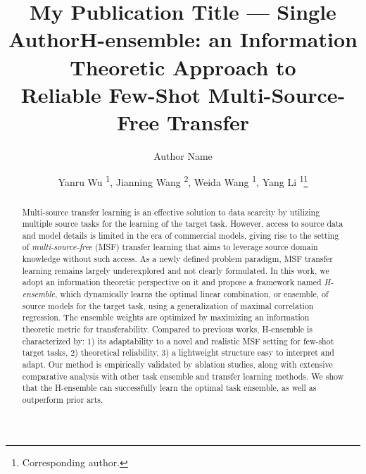 \documentclass[letterpaper]{article} %
\title{My Publication Title --- Single Author}
\author {
    Author Name
}
\title{H-ensemble: an Information Theoretic Approach to \\Reliable Few-Shot Multi-Source-Free Transfer}
\author {
    Yanru Wu \textsuperscript{\rm 1}, %
    Jianning Wang \textsuperscript{\rm 2},
    Weida Wang \textsuperscript{\rm 1},
    Yang Li \textsuperscript{\rm 1}\footnote{Corresponding author.} %
}
\begin{document}
\maketitle

\begin{abstract}
Multi-source transfer learning is an effective solution to data scarcity by utilizing multiple source tasks for the learning of the target task. However, access to source data and model details is limited in the era of commercial models, giving rise to the setting of \textit{multi-source-free} (MSF) transfer learning that aims to leverage source domain knowledge without such access. As a newly defined problem paradigm, MSF transfer learning remains largely underexplored and not clearly formulated. In this work, we adopt an information theoretic perspective on it and propose a framework named \textit{H-ensemble}, which dynamically learns the optimal linear combination, or ensemble, of source models for the target task, using a generalization of maximal correlation regression. The ensemble weights are optimized by maximizing an information theoretic metric for transferability. Compared to previous works, H-ensemble is characterized by: 1) its adaptability to a novel and realistic MSF setting for few-shot target tasks, 2) theoretical reliability, 3) a lightweight structure easy to interpret and adapt. Our method is empirically validated by ablation studies, along with extensive comparative analysis with other task ensemble and transfer learning methods. We show that the H-ensemble can successfully learn the optimal task ensemble, as well as outperform prior arts.

\end{abstract}
\end{document}
